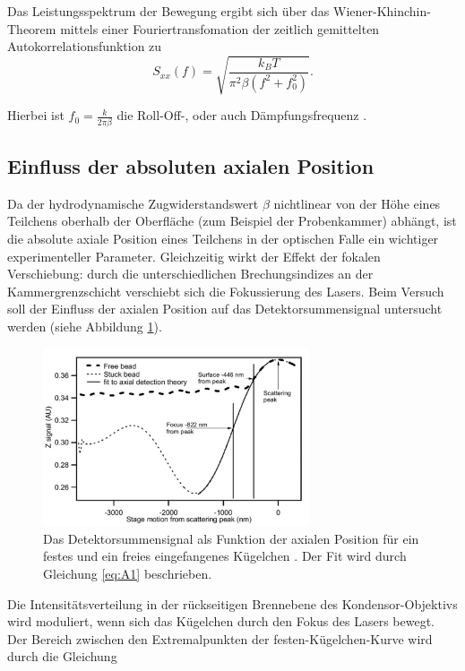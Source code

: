 Das Leistungsspektrum der Bewegung ergibt sich über das
Wiener-Khinchin-Theorem mittels einer Fouriertransfomation der zeitlich gemittelten Autokorrelationsfunktion zu
\begin{equation}
    S_{xx}(f)=\sqrt{\frac{k_B T}{\pi^2 \beta (f^2+f_0^2)}}.
\end{equation}

Hierbei ist $f_0 = \frac{k}{2 \pi \beta}$ die Roll-Off-, oder auch Dämpfungsfrequenz .
\subsection{Einfluss der absoluten axialen Position}
Da der hydrodynamische Zugwiderstandswert $\beta$ nichtlinear von der Höhe 
eines Teilchens oberhalb der Oberfläche (zum Beispiel der Probenkammer) abhängt, 
ist die absolute axiale Position eines Teilchens in der optischen Falle ein wichtiger experimenteller Parameter.
Gleichzeitig wirkt der Effekt der fokalen Verschiebung: durch die unterschiedlichen Brechungsindizes an der Kammergrenzschicht verschiebt sich die Fokussierung des Lasers.
Beim Versuch soll der Einfluss der axialen Position auf das Detektorsummensignal untersucht werden (siehe Abbildung \ref{fig:fokal}).

\begin{figure}[H]
    \centering\captionsetup{format=plain}
    \includegraphics[width=0.7\textwidth]{Bilder/OP_Fokal.png}
    \caption{Das Detektorsummensignal als Funktion der axialen Position für ein festes und ein freies eingefangenes Kügelchen  \cite{anleitung}. Der Fit wird durch Gleichung \ref{eq:A1} beschrieben.}
    \label{fig:fokal}
\end{figure}
Die Intensitätsverteilung in der rückseitigen Brennebene des Kondensor-Objektivs 
wird moduliert, wenn sich das Kügelchen durch den Fokus des Lasers bewegt.
Der Bereich zwischen den
Extremalpunkten der festen-Kügelchen-Kurve wird durch die Gleichung

